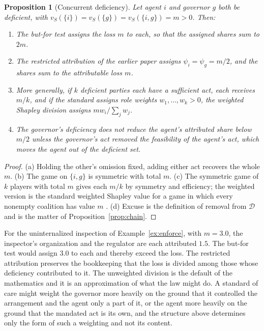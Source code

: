 \documentclass[11pt]{article}
\newcommand{\Dfc}{\mathcal D}
\theoremstyle{plain}
\newtheorem{proposition}{Proposition}
\theoremstyle{definition}
\begin{document}
\begin{proposition}[Concurrent deficiency]\label{prop:concurrent}
Let agent $i$ and governor $g$ both be deficient, with $v_S(\{i\})=v_S(\{g\})=v_S(\{i,g\})=m>0$. Then:
\begin{enumerate}[label=(\alph*),nosep]
\item The but-for test assigns the loss $m$ to each, so that the assigned shares sum to $2m$.
\item The restricted attribution of the earlier paper assigns $\psi_i=\psi_g=m/2$, and the shares sum to the attributable loss $m$.
\item More generally, if $k$ deficient parties each have a sufficient act, each receives $m/k$, and if the standard assigns role weights $w_1,\dots,w_k>0$, the weighted Shapley division assigns $mw_i/\sum_jw_j$.
\item The governor's deficiency does not reduce the agent's attributed share below $m/2$ unless the governor's act removed the feasibility of the agent's act, which moves the agent out of the deficient set.
\end{enumerate}
\end{proposition}

\begin{proof}
(a) Holding the other's omission fixed, adding either act recovers the whole $m$. (b) The game on $\{i,g\}$ is symmetric with total $m$. (c) The symmetric game of $k$ players with total $m$ gives each $m/k$ by symmetry and efficiency; the weighted version is the standard weighted Shapley value for a game in which every nonempty coalition has value $m$ \cite{shapley1953value}. (d) Excuse is the definition of removal from $\Dfc$ and is the matter of Proposition~\ref{prop:chain}.
\end{proof}

For the uninternalized inspection of Example~\ref{ex:enforce}, with $m=3.0$, the inspector's organization and the regulator are each attributed $1.5$. The but-for test would assign $3.0$ to each and thereby exceed the loss. The restricted attribution preserves the bookkeeping that the loss is divided among those whose deficiency contributed to it. The unweighted division is the default of the mathematics and it is an approximation of what the law might do. A standard of care might weight the governor more heavily on the ground that it controlled the arrangement and the agent only a part of it, or the agent more heavily on the ground that the mandated act is its own, and the structure above determines only the form of such a weighting and not its content.
\end{document}
